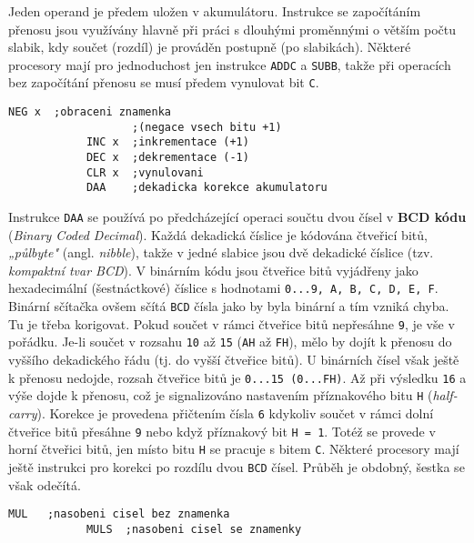           Jeden operand je předem uložen v akumulátoru. Instrukce se započítáním přenosu jsou 
          využívány hlavně při práci s dlouhými proměnnými o větším počtu slabik, kdy součet 
          (rozdíl) je prováděn postupně (po slabikách). Některé procesory mají pro jednoduchost jen 
          instrukce \texttt{ADDC} a \texttt{SUBB}, takže při operacích bez započítání přenosu se 
          musí předem vynulovat bit \texttt{C}.
         
          \begin{lstlisting}[style=luaMITASMStyle]
            NEG x  ;obraceni znamenka 
                   ;(negace vsech bitu +1)
            INC x  ;inkrementace (+1)
            DEC x  ;dekrementace (-1)
            CLR x  ;vynulovani
            DAA    ;dekadicka korekce akumulatoru
          \end{lstlisting}
         
          Instrukce \texttt{DAA} se používá po předcházející operaci součtu dvou čísel v 
          \textbf{BCD kódu} (\emph{Binary Coded Decimal}). Každá dekadická číslice je kódována 
          čtveřicí bitů, \emph{„půlbyte"} (angl. \emph{nibble}), takže v jedné slabice jsou dvě 
          dekadické číslice (tzv. \emph{kompaktní tvar BCD}). V binárním kódu jsou čtveřice bitů 
          vyjádřeny jako hexadecimální (šestnáctkové) číslice s hodnotami \texttt{0...9, A, B, C, 
          D, E, F}. Binární sčítačka ovšem sčítá \texttt{BCD} čísla jako by byla binární a tím 
          vzniká chyba. Tu je třeba korigovat. Pokud součet v rámci čtveřice bitů nepřesáhne 
          \texttt{9}, je vše v pořádku. Je-li součet v rozsahu \texttt{10} až \texttt{15} 
          (\texttt{AH} až \texttt{FH}), mělo by dojít k přenosu do vyššího dekadického řádu (tj. do 
          vyšší čtveřice bitů). U binárních čísel však ještě k přenosu nedojde, rozsah čtveřice 
          bitů je \texttt{0...15 (0...FH)}. Až při výsledku \texttt{16} a výše dojde k přenosu, což 
          je signalizováno nastavením příznakového bitu \texttt{H} (\emph{half-carry}). Korekce je 
          provedena přičtením čísla \texttt{6} kdykoliv součet v rámci dolní čtveřice bitů přesáhne 
          \texttt{9} nebo když příznakový bit  \texttt{H = 1}. Totéž se provede v horní čtveřici 
          bitů, jen místo bitu \texttt{H} se pracuje s bitem \texttt{C}. Některé procesory mají 
          ještě instrukci pro korekci po rozdílu dvou \texttt{BCD} čísel. Průběh je obdobný, šestka 
          se však odečítá.
         
          \begin{lstlisting}[style=luaMITASMStyle]
            MUL   ;nasobeni cisel bez znamenka
            MULS  ;nasobeni cisel se znamenky
          \end{lstlisting}
           
